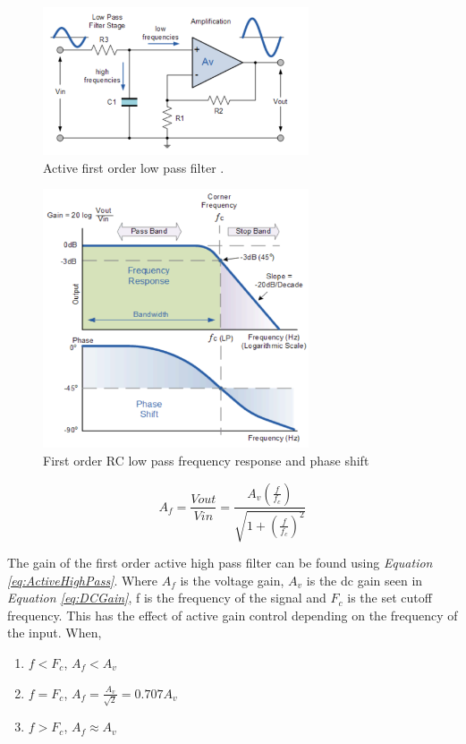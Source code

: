 \begin{figure}[h]
    \centering
    \includegraphics[width=0.70\textwidth]{graphics/lowPassFilter.png}
    \caption{Active first order low pass filter \cite{noauthor_active_2013-1}.}
    \label{fig:LowPassFilter}
\end{figure}

\begin{figure}[h]
    \centering
    \includegraphics[width=0.70\textwidth]{graphics/lowPassResponse.png}
    \caption{First order RC low pass frequency response and phase shift \cite{noauthor_low_2013}}
    \label{fig:LowPassResponse}
\end{figure}

\begin{equation}
    A_f = \frac{V{out}}{V{in}} = \frac{A_v(\frac{f}{f_c})}{\sqrt{1 + (\frac{f}{f_c})^2}}
    \label{eq:ActiveHighPass}
\end{equation}

The gain of the first order active high pass filter can be found using \textit{Equation \ref{eq:ActiveHighPass}}.
Where $A_f$ is the voltage gain, $A_v$ is the dc gain seen in \textit{Equation \ref{eq:DCGain}}, f is the frequency of the signal and $F_c$ is the set cutoff frequency.
This has the effect of active gain control depending on the frequency of the input.
When,
\begin{enumerate}
    \item $f < F_c$, $A_f < A_v$
    \item $f = F_c$, $A_f = \frac{A_v}{\sqrt{2}} = 0.707 A_v$
    \item$f > F_c$, $A_f \approx A_v$
\end{enumerate}


